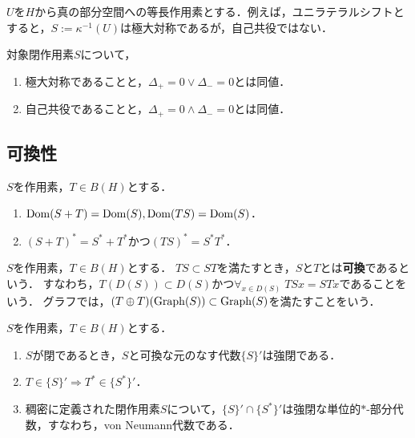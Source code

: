 \documentclass[uplatex,dvipdfmx]{jsreport}
\begin{document}
\begin{example}[自己共役な拡張を持たない場合]
    $U$を$H$から真の部分空間への等長作用素とする．例えば，ユニラテラルシフトとすると，$S:=\kappa^{-1}(U)$は極大対称であるが，自己共役ではない．
\end{example}

\begin{lemma}
    対象閉作用素$S$について，
    \begin{enumerate}
        \item 極大対称であることと，$\Delta_+=0\lor\Delta_-=0$とは同値．
        \item 自己共役であることと，$\Delta_+=0\land\Delta_-=0$とは同値．
    \end{enumerate}
\end{lemma}

\subsection{可換性}

\begin{lemma}
    $S$を作用素，$T\in B(H)$とする．
    \begin{enumerate}
        \item $\mathrm{Dom}(S+T)=\mathrm{Dom}(S),\mathrm{Dom}(TS)=\mathrm{Dom}(S)$．
        \item $(S+T)^*=S^*+T^*$かつ$(TS)^*=S^*T^*$．
    \end{enumerate}
\end{lemma}

\begin{definition}[commutative]
    $S$を作用素，$T\in B(H)$とする．
    $TS\subset ST$を満たすとき，$S$と$T$とは\textbf{可換}であるという．
    すなわち，$T(D(S))\subset D(S)$かつ$\forall_{x\in D(S)}\;TSx=STx$であることをいう．
    グラフでは，$(T\oplus T)(\mathrm{Graph}(S))\subset\mathrm{Graph}(S)$を満たすことをいう．
\end{definition}

\begin{lemma}
    $S$を作用素，$T\in B(H)$とする．
    \begin{enumerate}
        \item $S$が閉であるとき，$S$と可換な元のなす代数$\{S\}'$は強閉である．
        \item $T\in\{S\}'\Rightarrow T^*\in\{S^*\}'$．
        \item 稠密に定義された閉作用素$S$について，$\{S\}'\cap\{S^*\}'$は強閉な単位的$*$-部分代数，すなわち，von Neumann代数である．
    \end{enumerate}
\end{lemma}
\end{document}
